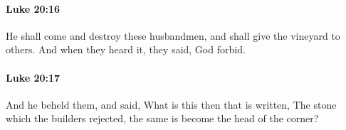 		\paragraph{Luke 20:16} %
			\label{LUKE-20-16}

			He shall come and destroy these husbandmen, and shall give the vineyard to others. And when they heard it, they said, God forbid.

			\begin{framed}
			\scriptsize
				\begin{compactdesc}
					\item[SBLG] 
				\end{compactdesc}
			\end{framed}

		\paragraph{Luke 20:17} %
			\label{LUKE-20-17}

			And he beheld them, and said, What is this then that is written, The stone which the builders rejected, the same is become the head of the corner?


